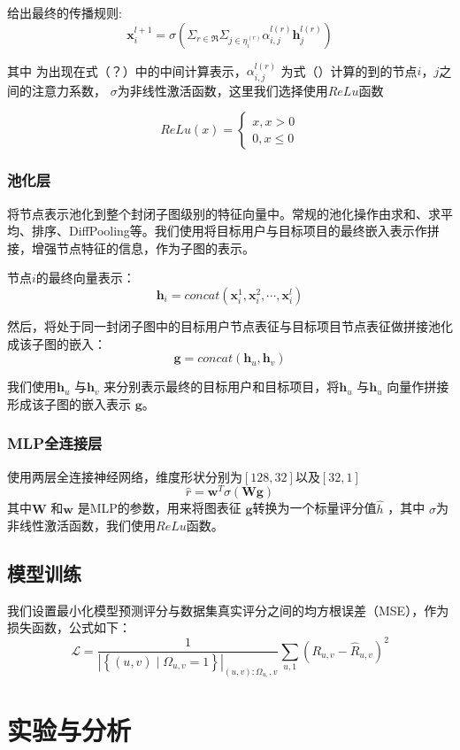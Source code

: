 \documentclass{ctexart}
\begin{document}
\begin{itemize}
    给出最终的传播规则:
    \begin{equation}
        \mathbf{x}_i^{l+1}=\sigma(\Sigma_{r\in\mathfrak{R}}\Sigma_{j\in{\eta_{i}^{(r)}}}\alpha_{i,j}^{l(r)}\mathbf{h}_{j}^{l(r)})
    \end{equation}
    
    其中 为出现在式（？）中的中间计算表示，$\alpha_{i,j}^{l(r)}$ 为式（）计算的到的节点$i$，$j$之间的注意力系数， $\sigma$为非线性激活函数，这里我们选择使用$ReLu$函数

    \begin{equation}
        ReLu(x)=\begin{cases}x,x>0\\0,x\leq0\end{cases}
    \end{equation}

\end{itemize}
\subsubsection{池化层}
将节点表示池化到整个封闭子图级别的特征向量中。常规的池化操作由求和、求平均、排序、DiffPooling等。我们使用将目标用户与目标项目的最终嵌入表示作拼接，增强节点特征的信息，作为子图的表示。

节点$i$的最终向量表示：
\begin{equation}
    \mathbf{h}_i=concat(\mathbf{x}_i^1,\mathbf{x}_i^2,\cdots,\mathbf{x}_i^l)
\end{equation}

然后，将处于同一封闭子图中的目标用户节点表征与目标项目节点表征做拼接池化成该子图的嵌入：
\begin{equation}
    \mathbf{g}=concat(\mathbf{h}_u,\mathbf{h}_v)
\end{equation}

我们使用$\mathbf{h}_u$ 与$\mathbf{h}_v$ 来分别表示最终的目标用户和目标项目，将$\mathbf{h}_u$ 与$\mathbf{h}_u$ 向量作拼接形成该子图的嵌入表示 $\mathbf{g}$。

\subsubsection{MLP全连接层}
使用两层全连接神经网络，维度形状分别为$[128,32]$以及$[32,1]$
\begin{equation}
    \hat{r}=\mathbf{w}^T\sigma(\mathbf{Wg})
\label{}
\end{equation}
其中$\mathbf{W}$ 和$\mathbf{w}$ 是MLP的参数，用来将图表征 $\mathbf{g}$转换为一个标量评分值$\hat{h}$ ，其中 $\sigma$为非线性激活函数，我们使用$ReLu$函数。
\subsection{模型训练}
我们设置最小化模型预测评分与数据集真实评分之间的均方根误差（MSE），作为损失函数，公式如下：
\begin{equation}
    \mathcal{L}=\frac{1}{\left|\left\{(u, v) \mid \Omega_{u, v}=1\right\}\right|_{(u, v): \Omega_{u,}, v}} \sum_{u, 1}\left(R_{u, v}-\widehat{R}_{u, v}\right)^{2}
\label{}
\end{equation}
\section{实验与分析}
\end{document}
